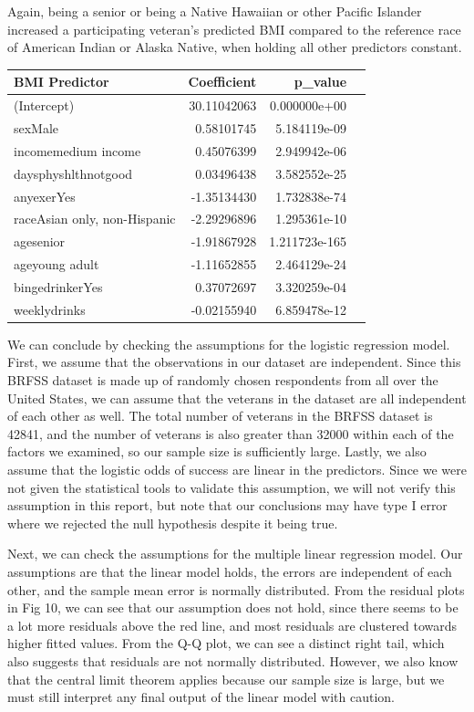 \documentclass[
  10pt,
  letterpaper,
  DIV=11,
  numbers=noendperiod]{scrartcl}
\begin{document}
Again, being a senior or being a Native Hawaiian or other Pacific
Islander increased a participating veteran's predicted BMI compared to
the reference race of American Indian or Alaska Native, when holding all
other predictors constant.

\begin{table}[h]
\centering
\renewcommand{\arraystretch}{0.8}
\begin{tabular}{l r r r}
\toprule
\textbf{BMI Predictor} & Coefficient & p\_value \\
\midrule
(Intercept) & 30.11042063 & 0.000000e+00 \\
sexMale & 0.58101745 & 5.184119e-09 \\
incomemedium income & 0.45076399 & 2.949942e-06 \\
daysphyshlthnotgood & 0.03496438 & 3.582552e-25 \\
anyexerYes & -1.35134430 & 1.732838e-74 \\
raceAsian only, non-Hispanic & -2.29296896 & 1.295361e-10 \\
agesenior & -1.91867928 & 1.211723e-165 \\
ageyoung adult & -1.11652855 & 2.464129e-24 \\
bingedrinkerYes & 0.37072697 & 3.320259e-04 \\
weeklydrinks & -0.02155940 & 6.859478e-12 \\
\bottomrule
\end{tabular}
\end{table}

We can conclude by checking the assumptions for the logistic regression
model. First, we assume that the observations in our dataset are
independent. Since this BRFSS dataset is made up of randomly chosen
respondents from all over the United States, we can assume that the
veterans in the dataset are all independent of each other as well. The
total number of veterans in the BRFSS dataset is 42841, and the number
of veterans is also greater than 32000 within each of the factors we
examined, so our sample size is sufficiently large. Lastly, we also
assume that the logistic odds of success are linear in the predictors.
Since we were not given the statistical tools to validate this
assumption, we will not verify this assumption in this report, but note
that our conclusions may have type I error where we rejected the null
hypothesis despite it being true.

Next, we can check the assumptions for the multiple linear regression
model. Our assumptions are that the linear model holds, the errors are
independent of each other, and the sample mean error is normally
distributed. From the residual plots in Fig 10, we can see that our
assumption does not hold, since there seems to be a lot more residuals
above the red line, and most residuals are clustered towards higher
fitted values. From the Q-Q plot, we can see a distinct right tail,
which also suggests that residuals are not normally distributed.
However, we also know that the central limit theorem applies because our
sample size is large, but we must still interpret any final output of
the linear model with caution.
\end{document}
